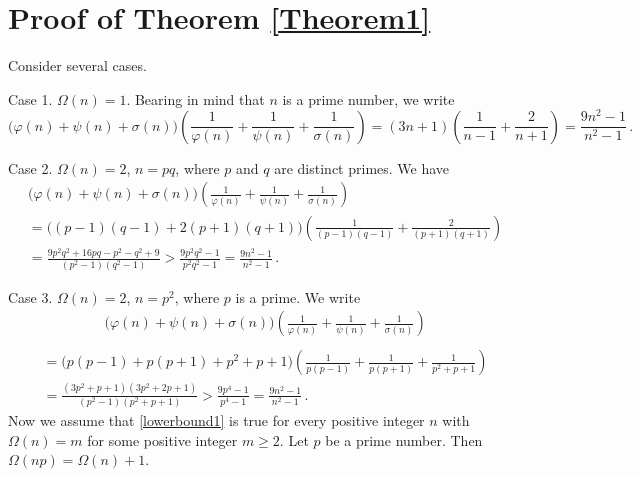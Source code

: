 \documentclass[12pt]{article}
\begin{document}
\section{Proof of Theorem \ref{Theorem1}}

Consider several cases.

Case 1. \; $\Omega(n)=1$. Bearing in mind that $n$ is a prime number, we write
\begin{equation*}
\big(\varphi(n)+\psi(n)+\sigma(n)\big)\left(\frac{1}{\varphi(n)}+\frac{1}{\psi(n)}+\frac{1}{\sigma(n)}\right)=(3n+1)\left(\frac{1}{n-1}+\frac{2}{n+1}\right)=\frac{9n^2-1}{n^2-1}\,.
\end{equation*}

Case 2. \; $\Omega(n)=2$, $n=pq$, where $p$ and $q$ are distinct primes. We have
\begin{align*}
&\big(\varphi(n)+\psi(n)+\sigma(n)\big)\left(\frac{1}{\varphi(n)}+\frac{1}{\psi(n)}+\frac{1}{\sigma(n)}\right)\\
&=\big((p-1)(q-1)+2(p+1)(q+1)\big)\left(\frac{1}{(p-1)(q-1)}+\frac{2}{(p+1)(q+1)}\right)\\
&=\frac{9p^2q^2+16pq-p^2-q^2+9}{(p^2 - 1) (q^2 - 1)}>\frac{9p^2q^2-1}{p^2q^2-1}=\frac{9n^2-1}{n^2-1}\,.
\end{align*}

Case 3. \; $\Omega(n)=2$, $n=p^2$, where $p$ is a prime. We write
\begin{align*}
&\big(\varphi(n)+\psi(n)+\sigma(n)\big)\left(\frac{1}{\varphi(n)}+\frac{1}{\psi(n)}+\frac{1}{\sigma(n)}\right)\\
\end{align*}
\begin{align*}
&=\big(p(p-1)+p(p+1)+p^2+p+1\big)\left(\frac{1}{p(p-1)}+\frac{1}{p(p+1)}+\frac{1}{p^2+p+1}\right)\\    
&=\frac{(3p^2+p+1)(3p^2+2p+1)}{(p^2-1) (p^2 + p + 1)}>\frac{9p^4-1}{p^4-1}=\frac{9n^2-1}{n^2-1}\,.
\end{align*}
Now we assume that \eqref{lowerbound1} is true for every positive integer $n$ with $\Omega(n)=m$ for some positive integer $m\geq2$.
Let $p$ be a prime number. Then $\Omega(np)=\Omega(n)+1$.
\end{document}
